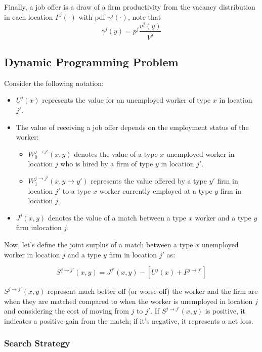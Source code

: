 \documentclass[
  letterpaper,
  DIV=11,
  numbers=noendperiod]{scrartcl}
\providecommand{\tightlist}{%
  \setlength{\itemsep}{0pt}\setlength{\parskip}{0pt}}\usepackage{longtable,booktabs,array}
\begin{document}
Finally, a job offer is a draw of a firm productivity from the vacancy
distribution in each location \(\Gamma^j(\cdot)\) with pdf
\(\gamma^j(\cdot )\), note that \[\gamma^j(y) = p^j\frac{v^j(y)}{V^j}\]

\hypertarget{dynamic-programming-problem}{%
\subsection{Dynamic Programming
Problem}\label{dynamic-programming-problem}}

Consider the following notation:

\begin{itemize}
\tightlist
\item
  \(U^{j}(x)\) represents the value for an unemployed worker of type
  \(x\) in location \(j'\).
\item
  The value of receiving a job offer depends on the employment status of
  the worker:

  \begin{itemize}
  \tightlist
  \item
    \(W^{j\to j'}_{0}(x,y)\) denotes the value of a type-\(x\)
    unemployed worker in location \(j\) who is hired by a firm of type
    \(y\) in location \(j'\).
  \item
    \(W^{j\to j'}_{1}(x,y \to y')\) represents the value offered by a
    type \(y'\) firm in location \(j'\) to a type \(x\) worker currently
    employed at a type \(y\) firm in location \(j\).
  \end{itemize}
\item
  \(J^j(x,y)\) denotes the value of a match between a type \(x\) worker
  and a type \(y\) firm inlocation \(j\).
\end{itemize}

Now, let's define the joint surplus of a match between a type \(x\)
unemployed worker in location \(j\) and a type \(y\) firm in location
\(j'\) as:

\[S^{j\to j'}(x,y) = J^{j'}(x,y) - [U^{j}(x) + F^{j\to j'}]\]

\(S^{j\to j'}(x,y)\) represent much better off (or worse off) the worker
and the firm are when they are matched compared to when the worker is
unemployed in location \(j\) and considering the cost of moving from
\(j\) to \(j'\). If \(S^{j\to j'}(x,y)\) is positive, it indicates a
positive gain from the match; if it's negative, it represents a net
loss.

\hypertarget{search-strategy}{%
\subsubsection{Search Strategy}\label{search-strategy}}
\end{document}
